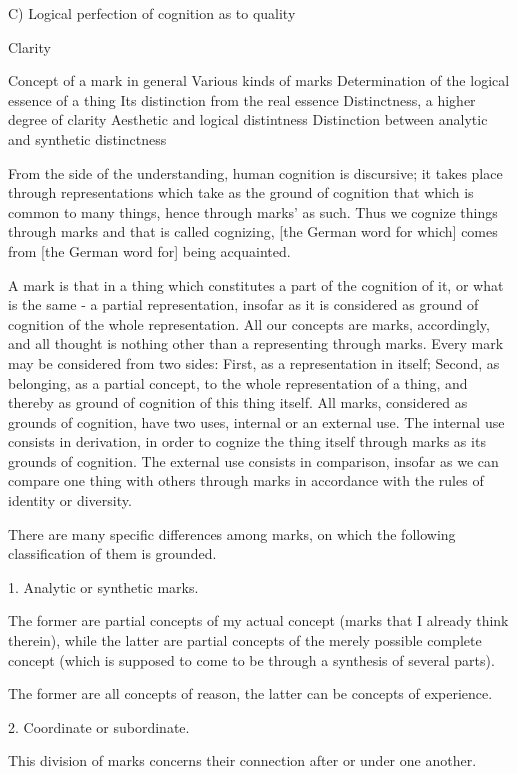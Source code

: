 C) Logical perfection of cognition as to quality

Clarity

    Concept of a mark in general
    Various kinds of marks
    Determination of the logical essence of a thing
    Its distinction from the real essence
    Distinctness, a higher degree of clarity
    Aesthetic and logical distintness
    Distinction between analytic and synthetic distinctness

From the side of the understanding,
human cognition is discursive;
it takes place through representations
which take as the ground of cognition
that which is common to many things,
hence through marks' as such.
Thus we cognize things through marks
and that is called cognizing,
[the German word for which] comes from
[the German word for] being acquainted.

A mark is that in a thing which constitutes
a part of the cognition of it, or
what is the same - a partial representation,
insofar as it is considered as
ground of cognition of the whole representation.
All our concepts are marks, accordingly, and
all thought is nothing other than a representing through marks.
Every mark may be considered from two sides:
First, as a representation in itself;
Second, as belonging, as a partial concept, to
the whole representation of a thing, and thereby
as ground of cognition of this thing itself.
All marks, considered as grounds of cognition, have two uses,
internal or an external use.
The internal use consists in derivation,
in order to cognize the thing itself
through marks as its grounds of cognition.
The external use consists in comparison,
insofar as we can compare one thing with others
through marks in accordance with the rules of
identity or diversity.

There are many specific differences among marks,
on which the following classification of them is grounded.

1. Analytic or synthetic marks.

The former are partial concepts of my actual concept
(marks that I already think therein),
while the latter are partial concepts of
the merely possible complete concept
(which is supposed to come to be
through a synthesis of several parts).

The former are all concepts of reason,
the latter can be concepts of experience.

2. Coordinate or subordinate.

This division of marks concerns
their connection after or under one another.

